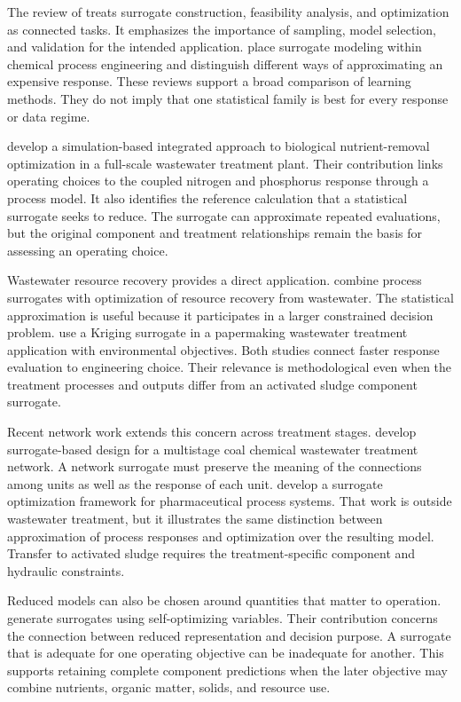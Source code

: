 The review of \citet{BhosekarIerapetritou2018} treats surrogate construction, feasibility analysis, and optimization as connected tasks. It emphasizes the importance of sampling, model selection, and validation for the intended application. \citet{McBride2019} place surrogate modeling within chemical process engineering and distinguish different ways of approximating an expensive response. These reviews support a broad comparison of learning methods. They do not imply that one statistical family is best for every response or data regime.

\citet{Fang2011} develop a simulation-based integrated approach to biological nutrient-removal optimization in a full-scale wastewater treatment plant. Their contribution links operating choices to the coupled nitrogen and phosphorus response through a process model. It also identifies the reference calculation that a statistical surrogate seeks to reduce. The surrogate can approximate repeated evaluations, but the original component and treatment relationships remain the basis for assessing an operating choice.

Wastewater resource recovery provides a direct application. \citet{Durkin2024} combine process surrogates with optimization of resource recovery from wastewater. The statistical approximation is useful because it participates in a larger constrained decision problem. \citet{He2023} use a Kriging surrogate in a papermaking wastewater treatment application with environmental objectives. Both studies connect faster response evaluation to engineering choice. Their relevance is methodological even when the treatment processes and outputs differ from an activated sludge component surrogate.

Recent network work extends this concern across treatment stages. \citet{Tang2026} develop surrogate-based design for a multistage coal chemical wastewater treatment network. A network surrogate must preserve the meaning of the connections among units as well as the response of each unit. \citet{Tsochatzidi2025} develop a surrogate optimization framework for pharmaceutical process systems. That work is outside wastewater treatment, but it illustrates the same distinction between approximation of process responses and optimization over the resulting model. Transfer to activated sludge requires the treatment-specific component and hydraulic constraints.

Reduced models can also be chosen around quantities that matter to operation. \citet{StrausSkogestad2018} generate surrogates using self-optimizing variables. Their contribution concerns the connection between reduced representation and decision purpose. A surrogate that is adequate for one operating objective can be inadequate for another. This supports retaining complete component predictions when the later objective may combine nutrients, organic matter, solids, and resource use.

